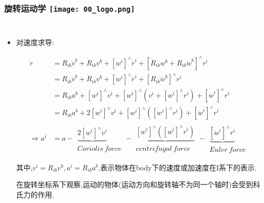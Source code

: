 \begin{frame}
  \frametitle{旋转运动学 \hfill \texttt{[image: 00\_logo.png]}}
  \begin{columns}
    
    \begin{itemize}
      \item 对速度求导:
  
      \begin{equation}
        \begin{split}
          \ddot{r} &= R_{ib} \dot{v}^b + \dot{R}_{ib} v^b +  [w^i]^\land \dot{r}^i + [\dot{R}_{ib} w^b + R_{ib}\dot{w}^b]^\land r^i  \\ 
          &= R_{ib}\dot{v}^b + \dot{R}_{ib} v^b + [w^i]^\land \dot{r}^i +  [R_{ib}\dot{w}^b]^\land r^i  \\ 
          &= R_{ib} a^b + [w^i]^\land v^i + [w^i]^\land (v^i+[w^i]^\land r^i) + [\dot{w}^i]^\land r^i \\ 
          &= R_{ib} a^b + 2[w^i]^\land v^i + [w^i]^\land([w^i]^\land r^i) + [\dot{w}^i]^\land r^i \\
          \Rightarrow a^i &= a - \begin{matrix}
          \underbrace{2[w^i]^\land v^i}\\ Coriolis \ force
        \end{matrix} - \begin{matrix}
          \underbrace{[w^i]^\land([w^i]^\land r^i)}\\ centrifugal \ force
        \end{matrix} - \begin{matrix}
          \underbrace{[\dot{w}^i]^\land r^i}\\ Euler \ force 
        \end{matrix}
        \end{split}
      \end{equation}
  
      其中,$v^i = R_{ib}v^b, a^i = R_{ib}a^b$,表示物体在body下的速度或加速度在I系下的表示.

      
  
      {\color{red}在旋转坐标系下观察,运动的物体(运动方向和旋转轴不为同一个轴时)会受到科氏力的作用.}
    \end{itemize}
    
  
  \end{columns}
  \end{frame}      
  
  



